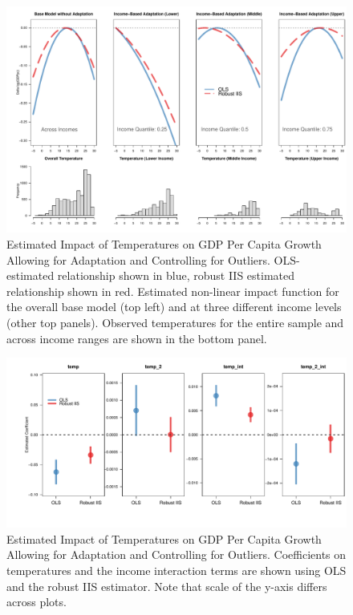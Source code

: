 \documentclass[11pt, letterpaper]{article}
\numberwithin{algorithm}{section}
\numberwithin{assumption}{section}
\numberwithin{lemma}{section}
\numberwithin{theorem}{section}
\numberwithin{corollary}{section}
\numberwithin{remark}{section}
\numberwithin{equation}{section}
\numberwithin{figure}{section}
\numberwithin{table}{section}
\begin{document}
\begin{figure}[!htbp]  %
\centering
\includegraphics[width = \textwidth]{eff.adapt.v2.pdf}
\caption{Estimated Impact of Temperatures on GDP Per Capita Growth Allowing for Adaptation and Controlling for Outliers. OLS-estimated relationship shown in blue, robust IIS estimated relationship shown in red. Estimated non-linear impact function for the overall base model (top left) and at three different income levels (other top panels). Observed temperatures for the entire sample and across income ranges are shown in the bottom panel. }
\label{fig_dist_app1}
\end{figure}




\begin{figure}[!htbp]  %
\centering
\includegraphics[width = \textwidth]{coef.adapt.pdf}
\caption{Estimated Impact of Temperatures on GDP Per Capita Growth Allowing for Adaptation and Controlling for Outliers. Coefficients on temperatures and the income interaction terms are shown using OLS and the robust IIS estimator. Note that scale of the y-axis differs across plots.}
\label{fig_dist_coef_app1}
\end{figure}
\end{document}

